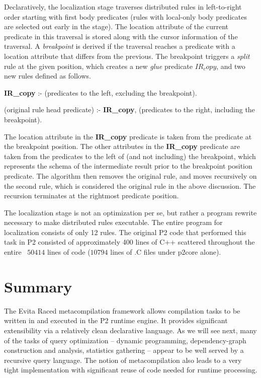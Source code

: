 Declaratively, the localization stage traverses distributed rules in
left-to-right order starting with first body predicates (rules with local-only
body predicates are selected out early in the stage).  The location attribute
of the current predicate in this traversal is stored along with the cursor
information of the traversal.  A {\em breakpoint} is derived if the traversal
reaches a predicate with a location attribute that differs from the previous.
The breakpoint triggers a {\em split} rule at the given position, which creates
a new {\em glue} predicate $IR_copy$, and two new rules defined as follows.
\begin{CompactEnumerate} 
\item {\bf IR\_copy} :- (predicates to the left, excluding the breakpoint).  
\item (original rule head predicate) :- {\bf IR\_copy}, (predicates to the right, including
  the breakpoint).  
\end{CompactEnumerate} 
The location attribute in the {\bf IR\_copy} predicate is taken from the
predicate at the breakpoint position.  The other attributes in the {\bf
IR\_copy} predicate are taken from the predicates to the left of (and not
including) the breakpoint, which represents the schema of the intermediate
result prior to the breakpoint position predicate.  The algorithm then removes
the original rule, and moves recursively on the second rule, which is
considered the original rule in the above discussion.  The recursion terminates
at the rightmost predicate position.

The localization stage is not an optimization per se, but rather a program
rewrite necessary to make distributed rules executable.  The entire \OVERLOG
program for localization consists of only 12 rules.  The original P2 code that
performed this task in P2 consisted of approximately 400 lines of C++ scattered
throughout the entire ~$50414$ lines of code ($10794$ lines of .C files under
p2core alone).

\section{Summary} 
\label{ch:evita:sec:summary} 

The Evita Raced metacompilation framework allows \OVERLOG compilation tasks to
be written in \OVERLOG and executed in the P2 runtime engine.  It provides
significant extensibility via a relatively clean declarative language.  As we
will see next, many of the tasks of query optimization -- dynamic programming,
dependency-graph construction and analysis, statistics gathering -- appear to
be well served by a recursive query language.  The notion of metacompilation
also leads to a very tight implementation with significant reuse of code needed
for runtime processing.

